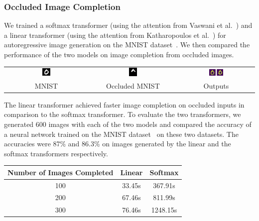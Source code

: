 \documentclass{article}
\newcommand\Tstrut{\rule{0pt}{2.6ex}}
\begin{document}
\subsubsection{Occluded Image Completion}
We trained a softmax transformer (using the attention from Vaswani et al.~\cite{vaswaniAttention}) and a linear transformer (using the attention from Katharopoulos et al.~\cite{transformersRNN}) for autoregressive image generation on the MNIST dataset~\cite{lecun2010mnist}. We then compared the performance of the two models on image completion from occluded images.
\begin{center}
    \begin{tabular}{c c c }
        \includegraphics[width=0.1\textwidth]{images/input0.png} & \includegraphics[width=0.1\textwidth]{images/occuluded0.png} & \includegraphics[width=0.2\textwidth]{images/result0.png} \\
		MNIST & Occluded MNIST & Outputs
    \end{tabular}
\end{center}
    The linear transformer achieved faster image completion on occluded inputs in comparison to the softmax transformer. To evaluate the two transformers, we generated 600 images with each of the two models and compared the accuracy of a neural network trained on the MNIST dataset~\cite{lecun2010mnist} on these two datasets. The accuracies were 87\% and 86.3\% on images generated by the linear and the softmax transformers respectively.
\begin{center}
    \begin{tabular}{c|c|c}
        Number of Images Completed & Linear & Softmax \\
        \hline
         100 & 33.45s & 367.91s \Tstrut\\
         200 & 67.46s & 811.99s\\
         300 & 76.46s & 1248.15s
    \end{tabular}
\end{center}
\end{document}
